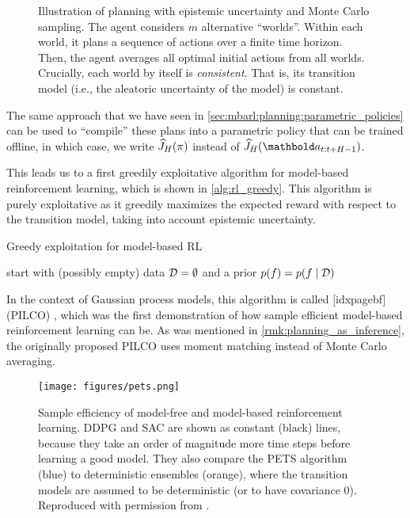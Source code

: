 \begin{figure}
  \caption{Illustration of planning with epistemic uncertainty and Monte Carlo sampling.
  The agent considers $m$ alternative ``worlds''. Within each world, it plans a sequence of actions over a finite time horizon.
  Then, the agent averages all optimal initial actions from all worlds.
  Crucially, each world by itself is \emph{consistent}.
  That is, its transition model (i.e., the aleatoric uncertainty of the model) is constant.}
\end{figure}

The same approach that we have seen in \cref{sec:mbarl:planning:parametric_policies} can be used to ``compile'' these plans into a parametric policy that can be trained offline, in which case, we write $\J{\pi}[H]$ instead of $\J{\va_{t:t+H-1}}[H]$.

This leads us to a first greedily exploitative algorithm for model-based reinforcement learning, which is shown in \cref{alg:rl_greedy}.
This algorithm is purely exploitative as it greedily maximizes the expected reward with respect to the transition model, taking into account epistemic uncertainty.

\begin{algorithm}
  \caption{Greedy exploitation for model-based RL}\label{alg:rl_greedy}
  start with (possibly empty) data $\mathcal{D} = \emptyset$ and a prior $p(f) = p(f \mid \mathcal{D})$\;
\end{algorithm}

In the context of Gaussian process models, this algorithm is called [idxpagebf] (PILCO) \citep{deisenroth2011pilco}, which was the first demonstration of how sample efficient model-based reinforcement learning can be.
As was mentioned in \cref{rmk:planning_as_inference}, the originally proposed PILCO uses moment matching instead of Monte Carlo averaging.

\begin{figure*}
  \texttt{[image: figures/pets.png]}
  \caption{Sample efficiency of model-free and model-based reinforcement learning.
  DDPG and SAC are shown as constant (black) lines, because they take an order of magnitude more time steps before learning a good model.
  They also compare the PETS algorithm (blue) to deterministic ensembles (orange), where the transition models are assumed to be deterministic (or to have covariance $0$).
  Reproduced with permission from .}
\end{figure*}

